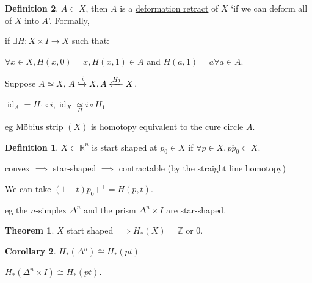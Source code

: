 \documentclass{article}
\theoremstyle{definition}
\newtheorem*{definition}{Definition}
\newtheorem{theorem}{Theorem}
\newtheorem{corollary}[theorem]{Corollary}
\begin{document}
    \begin{definition}
        \(A \subset X\), then \(A \) is a \underline{deformation retract} of \(X\) `if we can deform all of \(X\) into \(A\)'. Formally,

        if \(\exists H: X \times I \to X\) such that:
        
        \(\forall x\in X, H(x,0)=x, H(x,1)\in A\) and \(H(a,1)=a \forall a\in A\).

        Suppose \(A \simeq X\), \(A \xhookrightarrow{i} X, A \xleftarrow{H_1} X\).

        \(\operatorname{id}_{A} = H_1 \circ i, \operatorname{id}_{X} \underset{H}{\simeq} i \circ H_1\)

        eg M\"obius strip \((X)\) is homotopy equivalent to the cure circle \(A\).


        \begin{definition}
            \(X \subset \mathbb{R}^n\) is start shaped at \(p_0 \in X\) if \(\forall p\in X, \overline{pp_0} \subset X\).
        \end{definition}


        convex \(\implies\) star-shaped \(\implies\) contractable (by the straight line homotopy)

        We can take \((1-t)p_0 + ^{\top}  = H(p,t)\).

        eg the \(n\)-simplex \(\Delta^n\) and the prism \(\Delta^n \times I\) are star-shaped.

    \end{definition}

    \begin{theorem}
        \(X\) start shaped \(\implies H_{\ast} (X) = \mathbb{Z}\) or \(0\).
    \end{theorem}

    \begin{corollary}
        \(H_{\ast} (\Delta^n) \cong H_{\ast} (pt)\)

        \(H_{\ast} (\Delta^n \times I) \cong H_{\ast} (p t)\).
    \end{corollary}
\end{document}
